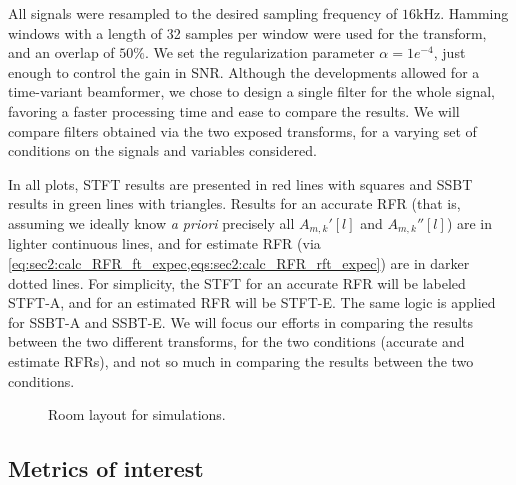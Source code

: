 All signals were resampled to the desired sampling frequency of $16\si{\kilo\hertz}$. Hamming windows with a length of 32 samples per window were used for the transform, and an overlap of $50\%$. We set the regularization parameter $\alpha = 1e^{-4}$, just enough to control the gain in SNR. Although the developments allowed for a time-variant beamformer, we chose to design a single filter for the whole signal, favoring a faster processing time and ease to compare the results. We will compare filters obtained via the two exposed transforms, for a varying set of conditions on the signals and variables considered.

In all plots, STFT results are presented in red lines with squares and SSBT results in green lines with triangles. Results for an accurate RFR (that is, assuming we ideally know \textit{a priori} precisely all $A_{m,k}'[l]$ and $A_{m,k}''[l]$) are in lighter continuous lines, and for estimate RFR (via \cref{eq:sec2:calc_RFR_ft_expec,eqs:sec2:calc_RFR_rft_expec}) are in darker dotted lines. For simplicity, the STFT for an accurate RFR will be labeled STFT-A, and for an estimated RFR will be STFT-E. The same logic is applied for SSBT-A and SSBT-E. We will focus our efforts in comparing the results between the two different transforms, for the two conditions (accurate and estimate RFRs), and not so much in comparing the results between the two conditions.

\begin{figure}[!t]
	\centering
	
	\caption{Room layout for simulations.}
	\label{fig:room_layout}
\end{figure}
%

\subsection{Metrics of interest}

